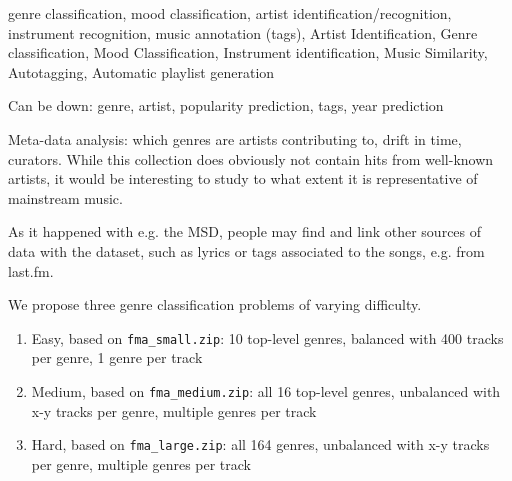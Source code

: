 \documentclass{article}
\begin{document}


genre classification, mood classification, artist identification/recognition, instrument recognition, music annotation (tags),
Artist Identification, Genre classification, Mood Classification, Instrument identification, Music Similarity, Autotagging, Automatic playlist generation

Can be down: genre, artist, popularity prediction, tags, year prediction




Meta-data analysis: which genres are artists contributing to, drift in time, curators.
While this collection does obviously not contain hits from well-known artists, it would be interesting to study to what extent it is representative of mainstream music.

As it happened with e.g. the MSD, people may find and link other sources of data with the dataset, such as lyrics or tags associated to the songs, e.g. from last.fm.

We propose three genre classification problems of varying difficulty.

\begin{enumerate}
	\item Easy, based on \texttt{fma\_small.zip}: 10 top-level genres, balanced with 400 tracks per genre, 1 genre per track
	\item Medium, based on \texttt{fma\_medium.zip}: all 16 top-level genres, unbalanced with x-y tracks per genre, multiple genres per track
	\item Hard, based on \texttt{fma\_large.zip}: all 164 genres, unbalanced with x-y tracks per genre, multiple genres per track
\end{enumerate}
\end{document}
